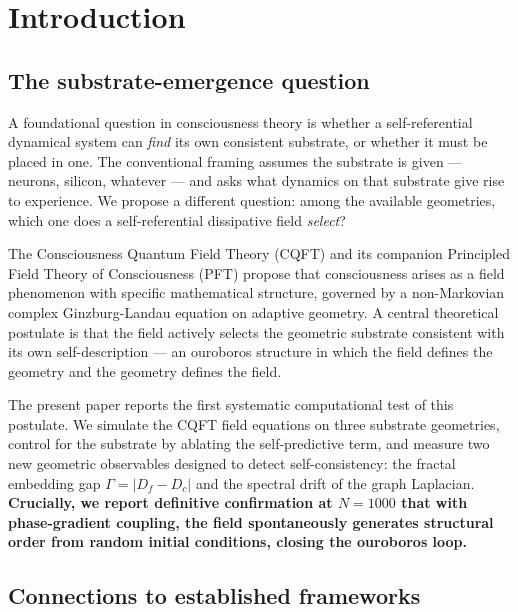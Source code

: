 \documentclass[12pt,a4paper]{article}
\theoremstyle{plain}
\theoremstyle{definition}
\begin{document}
\clearpage
\tableofcontents
\clearpage

\section{Introduction}

\subsection{The substrate-emergence question}

A foundational question in consciousness theory is whether a self-referential
dynamical system can \emph{find} its own consistent substrate, or whether it
must be placed in one. The conventional framing assumes the substrate is given
--- neurons, silicon, whatever --- and asks what dynamics on that substrate give
rise to experience. We propose a different question: among the available
geometries, which one does a self-referential dissipative field \emph{select}?

The Consciousness Quantum Field Theory (CQFT) and its companion Principled Field
Theory of Consciousness (PFT) \citep{solis2024cqft} propose that consciousness
arises as a field phenomenon with specific mathematical structure, governed by
a non-Markovian complex Ginzburg-Landau equation on adaptive geometry. A central
theoretical postulate is that the field actively selects the geometric substrate
consistent with its own self-description --- an ouroboros structure in which the
field defines the geometry and the geometry defines the field.

The present paper reports the first systematic computational test of this
postulate. We simulate the CQFT field equations on three substrate geometries,
control for the substrate by ablating the self-predictive term, and measure two
new geometric observables designed to detect self-consistency: the fractal
embedding gap $\Gamma = |D_f - D_c|$ and the spectral drift of the graph
Laplacian. \textbf{Crucially, we report definitive confirmation at $N=1000$ that
with phase-gradient coupling, the field spontaneously generates structural order
from random initial conditions, closing the ouroboros loop.}

\subsection{Connections to established frameworks}
\end{document}
